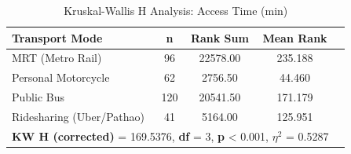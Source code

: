 \begin{table}[htbp]
\centering
\caption{Kruskal-Wallis H Analysis: Access Time (min)}
\label{tab:analysis_02_access_time}
\begin{tabular}{lcccc}
\hline
\textbf{Transport Mode} & \textbf{n} & \textbf{Rank Sum} & \textbf{Mean Rank} \\
\hline
MRT (Metro Rail) & 96 & 22578.00 & 235.188 \\
Personal Motorcycle & 62 & 2756.50 & 44.460 \\
Public Bus & 120 & 20541.50 & 171.179 \\
Ridesharing (Uber/Pathao) & 41 & 5164.00 & 125.951 \\
\hline
\multicolumn{4}{l}{\textbf{KW H (corrected)} = 169.5376, \textbf{df} = 3, \textbf{p} < 0.001, \textbf{$\eta^2$} = 0.5287} \\
\hline
\end{tabular}
\end{table}
